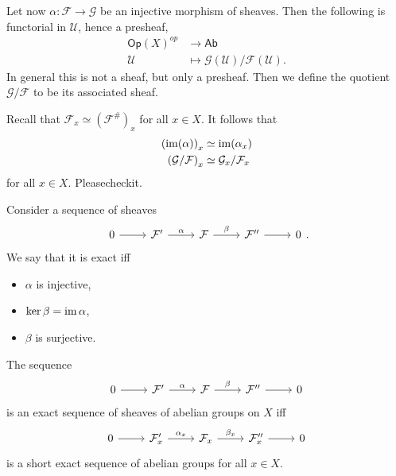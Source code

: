 \documentclass[../Main]{subfiles}
\begin{document}
\begin{defn}
Let now $\alpha\colon \mathcal{F} \to \mathcal{G}$ be an injective morphism of sheaves.
Then the following is functorial in $\mathcal{U}$, hence a presheaf,
\begin{align}
	\mathsf{Op}(X)^{op} &\longrightarrow \mathsf{Ab} \\
	\mathcal{U} &\longmapsto \mathcal{G}(\mathcal{U})/\mathcal{F}(\mathcal{U}) \nonumber
.\end{align} 
In general this is not a sheaf, but only a presheaf.
Then we define the quotient $\mathcal{G}/\mathcal{F}$ to be its associated sheaf.
\end{defn}

\begin{rem}[]
	Recall that $\mathcal{F}_x \simeq \left( \mathcal{F}^\# \right)_x$ for all $x \in X$.
	It follows that
	\begin{align}
		\left( \operatorname{im}(\alpha) \right)_x &\simeq \operatorname{im} (\alpha_x)\\
		\left( \mathcal{G}/\mathcal{F} \right)_x &\simeq \mathcal{G}_x / \mathcal{F}_x
	\end{align} 
	for all $x \in X$.
	Pleasecheckit.
\end{rem}

\begin{defn}
	Consider a sequence of sheaves
	\begin{equation}
	\begin{tikzcd}
		0 \arrow[r, "", rightarrow] &
		\mathcal{F}' \arrow[r, "\alpha", rightarrow] &
		\mathcal{F} \arrow[r, "\beta", rightarrow] &
		\mathcal{F}'' \arrow[r, "", rightarrow] &
		0
	\end{tikzcd}
	.\end{equation} 
	We say that it is exact iff
	\begin{itemize}
		\item $\alpha$ is injective,
		\item $\ker \beta = \operatorname{im} \alpha$,
		\item $\beta$ is surjective.
	\end{itemize}
\end{defn}

\begin{prop}[]
	The sequence
	\begin{equation}
	\begin{tikzcd}
		0 \arrow[r, "", rightarrow] &
		\mathcal{F}' \arrow[r, "\alpha", rightarrow] &
		\mathcal{F} \arrow[r, "\beta", rightarrow] &
		\mathcal{F}'' \arrow[r, "", rightarrow] &
		0
	\end{tikzcd}
	\end{equation} 
	is an exact sequence of sheaves of abelian groups on $X$ iff
	\begin{equation}
	\begin{tikzcd}
		0 \arrow[r, "", rightarrow] &
		\mathcal{F}_x' \arrow[r, "\alpha_x", rightarrow] &
		\mathcal{F}_x \arrow[r, "\beta_x", rightarrow] &
		\mathcal{F}_x'' \arrow[r, "", rightarrow] &
		0
	\end{tikzcd}
	\end{equation} 
	is a short exact sequence of abelian groups for all $x \in X$.
\end{prop}
\end{document}
